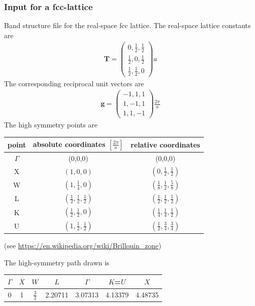 \documentclass[final,12pt]{article}
\newcommand{\mat}[1]{\mathbf{#1}}
\begin{document}
{{{{{{\subsubsection{Input for a fcc-lattice}
Band structure file for the real-space fcc lattice. The real-space
lattice constants are
\begin{eqnarray}
\mat{T}=\left(\begin{array}{ccc}
0,\frac{1}{2},\frac{1}{2}\\
\frac{1}{2},0,\frac{1}{2}\\
\frac{1}{2},\frac{1}{2},0\end{array}
\right)a
\end{eqnarray}
The corresponding reciprocal unit vectors are
\begin{eqnarray}
\mat{g}=\left(\begin{array}{ccc}
-1,1,1\\
1,-1,1\\
1,1,-1
\end{array}\right)\frac{2\pi}{a}
\end{eqnarray}
The high symmetry points are 
\begin{center}
\begin{tabular}{|c|c|c|}
\hline
point & absolute coordinates $\left[\frac{2\pi}{a}\right]$
      & relative coordinates\\
\hline
$\Gamma$ & (0,0,0) & (0,0,0)\\
X        & $(1,0,0)$ &$(0,\frac{1}{2},\frac{1}{2})$\\
W        & $(1,\frac{1}{4},0)$ &$(\frac{1}{8},\frac{1}{2},\frac{5}{8})$\\
L        & $(\frac{1}{2},\frac{1}{2},\frac{1}{2})$ 
              & $(\frac{1}{2},\frac{1}{2},\frac{1}{2})$\\
K        & $(\frac{1}{2},\frac{1}{2},0)$ 
              & $(\frac{1}{4},\frac{1}{4},\frac{1}{2})$\\
U        & $(1,\frac{1}{2},\frac{1}{2})$ 
              & $(\frac{1}{2},\frac{3}{4},\frac{3}{4})$\\
\hline
\end{tabular}
\end{center}
(see \url{https://en.wikipedia.org/wiki/Brillouin_zone})

The high-symmetry path drawn is
\begin{center}
\begin{tabular}{|c|c|c|c|c|c|c|}
\hline
$\Gamma$ & $X$ & $W$           & $L$     & $\Gamma$ & $K$=$U$ &  $X$    \\
\hline
0        & 1   & $\frac{3}{2}$ & 2.20711 & 3.07313  & 4.13379 & 4.48735 \\
\hline
\end{tabular}
\end{center}

}}}}}}
\end{document}
